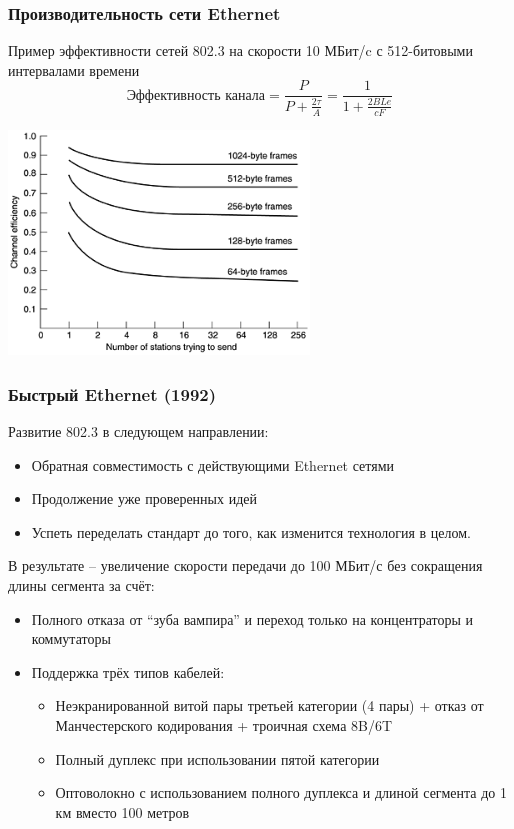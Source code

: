 \documentclass[utf8]{beamer}
\begin{document}
\begin{frame}
\frametitle{Производительность сети Ethernet}
Пример эффективности сетей 802.3 на скорости 10 МБит/c с 512-битовыми интервалами времени
$$
\textrm{Эффективность канала}=\frac{P}{P+\frac{2\tau}{A}} = \frac{1}{1+\frac{2BLe}{cF}}
$$
\begin{center}
\includegraphics[width=0.6\textwidth]{pic/eth-efficiency.png}
\end{center}
\end{frame}
\begin{frame}
\frametitle{Быстрый Ethernet (1992)}
Развитие 802.3 в следующем направлении:
\begin{itemize}
\item Обратная совместимость с действующими Ethernet сетями
\item Продолжение уже проверенных идей
\item Успеть переделать стандарт до того, как изменится технология в целом.
\end{itemize}
В результате -- увеличение скорости передачи до 100 МБит/с без сокращения длины сегмента за счёт:
\begin{itemize}
\item Полного отказа от ``зуба вампира'' и переход только на концентраторы и коммутаторы
\item Поддержка трёх типов кабелей:
\begin{itemize}
\item Неэкранированной витой пары третьей категории (4 пары) + отказ от Манчестерского кодирования + троичная схема 8B/6T
\item Полный дуплекс при использовании пятой категории
\item Оптоволокно с использованием полного дуплекса и длиной сегмента до 1 км вместо 100 метров
\end{itemize}

\end{itemize}
\end{frame}
\end{document}
